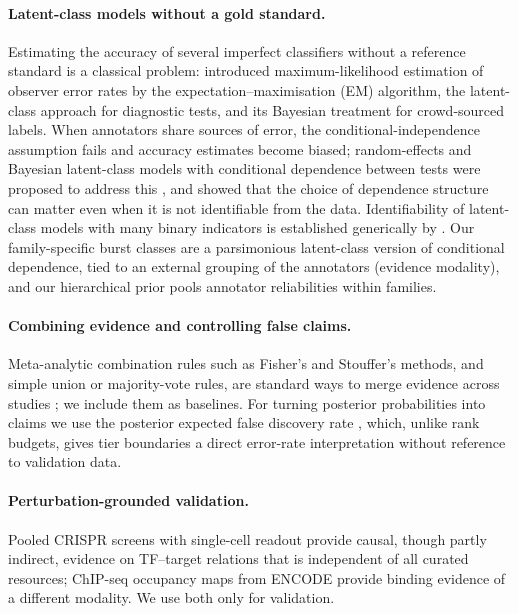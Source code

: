 \paragraph{Latent-class models without a gold standard.}
Estimating the accuracy of several imperfect classifiers without a reference standard is a classical problem: \citet{dawid1979maximum} introduced maximum-likelihood estimation of observer error rates by the expectation--maximisation (EM) algorithm, \citet{hui1980estimating} the latent-class approach for diagnostic tests, and \citet{raykar2010learning} its Bayesian treatment for crowd-sourced labels. When annotators share sources of error, the conditional-independence assumption fails and accuracy estimates become biased; random-effects and Bayesian latent-class models with conditional dependence between tests were proposed to address this \citep{qu1996random,dendukuri2001bayesian}, and \citet{albert2004cautionary} showed that the choice of dependence structure can matter even when it is not identifiable from the data. Identifiability of latent-class models with many binary indicators is established generically by \citet{allman2009identifiability}. Our family-specific burst classes are a parsimonious latent-class version of conditional dependence, tied to an external grouping of the annotators (evidence modality), and our hierarchical prior pools annotator reliabilities within families.

\paragraph{Combining evidence and controlling false claims.}
Meta-analytic combination rules such as Fisher's and Stouffer's methods, and simple union or majority-vote rules, are standard ways to merge evidence across studies \citep{tseng2012comprehensive}; we include them as baselines. For turning posterior probabilities into claims we use the posterior expected false discovery rate \citep{newton2004detecting}, which, unlike rank budgets, gives tier boundaries a direct error-rate interpretation without reference to validation data.

\paragraph{Perturbation-grounded validation.}
Pooled CRISPR screens with single-cell readout \citep{dixit2016perturb,adamson2016multiplexed,shifrut2018genome,norman2019exploring,papalexi2021characterizing,replogle2022mapping} provide causal, though partly indirect, evidence on TF--target relations that is independent of all curated resources; ChIP-seq occupancy maps from ENCODE \citep{encode2012integrated,gerstein2012architecture} provide binding evidence of a different modality. We use both only for validation.
